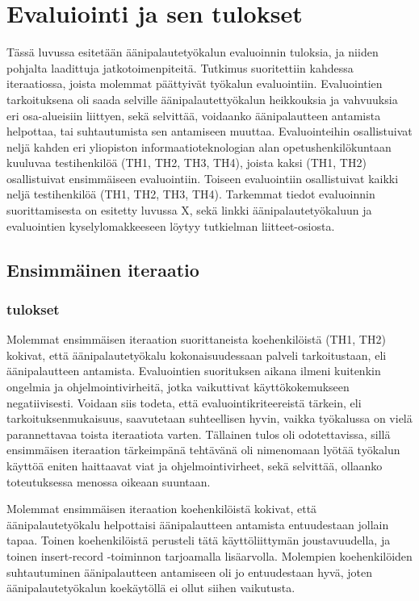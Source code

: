 \documentclass[utf8]{gradu3}
\begin{document}
%

\chapter{Evaluiointi ja sen tulokset}

Tässä luvussa esitetään äänipalautetyökalun evaluoinnin tuloksia, ja niiden pohjalta laadittuja jatkotoimenpiteitä. Tutkimus suoritettiin kahdessa iteraatiossa, joista molemmat päättyivät työkalun evaluointiin. Evaluointien tarkoituksena oli saada selville äänipalautettyökalun heikkouksia ja vahvuuksia eri osa-alueisiin liittyen, sekä selvittää, voidaanko äänipalautteen antamista helpottaa, tai suhtautumista sen antamiseen muuttaa. Evaluointeihin osallistuivat neljä kahden eri yliopiston informaatioteknologian alan opetushenkilökuntaan kuuluvaa testihenkilöä (TH1, TH2, TH3, TH4), joista kaksi (TH1, TH2) osallistuivat ensimmäiseen evaluointiin. Toiseen evaluointiin osallistuivat kaikki neljä testihenkilöä (TH1, TH2, TH3, TH4). Tarkemmat tiedot evaluoinnin suorittamisesta on esitetty luvussa X, sekä linkki äänipalautetyökaluun ja evaluointien kyselylomakkeeseen löytyy tutkielman liitteet-osiosta.

\section{Ensimmäinen iteraatio}

\subsection{tulokset}

Molemmat ensimmäisen iteraation suorittaneista koehenkilöistä (TH1, TH2) kokivat, että äänipalautetyökalu kokonaisuudessaan palveli tarkoitustaan, eli äänipalautteen antamista. Evaluointien suorituksen aikana ilmeni kuitenkin ongelmia ja ohjelmointivirheitä, jotka vaikuttivat käyttökokemukseen negatiivisesti. Voidaan siis todeta, että evaluointikriteereistä tärkein, eli tarkoituksenmukaisuus, saavutetaan suhteellisen hyvin, vaikka työkalussa on vielä parannettavaa toista iteraatiota varten. Tällainen tulos oli odotettavissa, sillä ensimmäisen iteraation tärkeimpänä tehtävänä oli nimenomaan lyötää työkalun käyttöä eniten haittaavat viat ja ohjelmointivirheet, sekä selvittää, ollaanko toteutuksessa menossa oikeaan suuntaan.

Molemmat ensimmäisen iteraation koehenkilöistä kokivat, että äänipalautetyökalu helpottaisi äänipalautteen antamista entuudestaan jollain tapaa. Toinen koehenkilöistä perusteli tätä käyttöliittymän joustavuudella, ja toinen insert-record -toiminnon tarjoamalla lisäarvolla. Molempien koehenkilöiden suhtautuminen äänipalautteen antamiseen oli jo entuudestaan hyvä, joten äänipalautetyökalun koekäytöllä ei ollut siihen vaikutusta.
\end{document}
